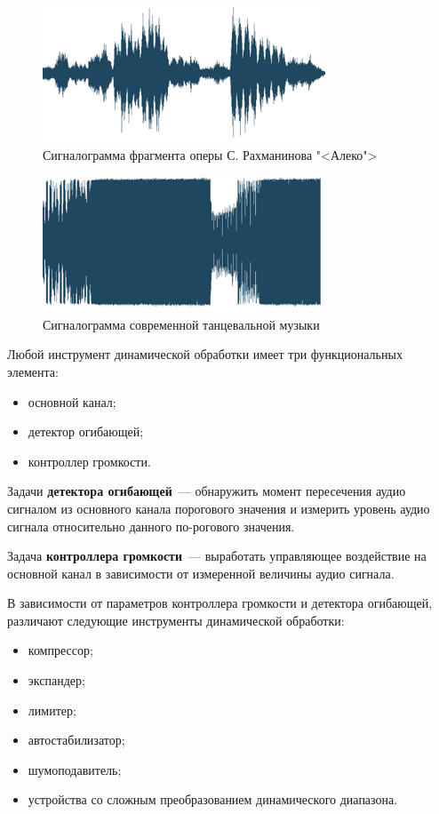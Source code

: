 \documentclass[oneside, final, 14pt]{extreport}
\begin{document}
\begin{figure}[h!]
  \centering
  \includegraphics[width=0.75\textwidth]{pic-signal-01}
  \caption{Сигналограмма фрагмента оперы С. Рахманинова "<Алеко">}
  \label{pic-signal-01}
\end{figure}

\begin{figure}[h!]
  \centering
  \includegraphics[width=0.75\textwidth]{pic-signal-02}
  \caption{Сигналограмма современной танцевальной музыки}
  \label{pic-signal-02}
\end{figure}

Любой инструмент динамической обработки имеет три функциональных элемента:
\begin{itemize}
  \item основной канал;
  \item детектор огибающей;
  \item контроллер громкости.
\end{itemize}

Задачи \textbf{детектора огибающей}~--- обнаружить момент пересечения аудио сигналом из основного канала порогового значения и измерить уровень аудио сигнала относительно данного по-рогового значения.

Задача \textbf{контроллера громкости}~--- выработать управляющее воздействие на основной канал в зависимости от измеренной величины аудио сигнала.

В зависимости от параметров контроллера громкости и детектора огибающей, различают следующие инструменты динамической обработки:
\begin{itemize}
  \item компрессор;
  \item экспандер;
  \item лимитер;
  \item автостабилизатор;
  \item шумоподавитель;
  \item устройства со сложным преобразованием динамического диапазона.
\end{itemize}
\end{document}
